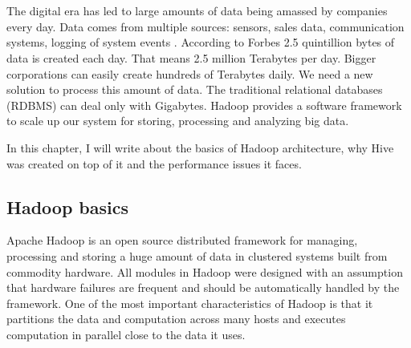 \chapter{\bevezetes}


The digital era has led to large amounts of data being amassed by companies every day. Data comes from multiple sources: sensors, sales data, communication systems, logging of system events \etc. According to Forbes \cite{Forbes} 2.5 quintillion bytes of data is created each day. That means 2.5 million Terabytes per day. Bigger corporations can easily create hundreds of Terabytes daily. We need a new solution to process this amount of data. The traditional relational databases (RDBMS) can deal only with Gigabytes. Hadoop provides a software framework to scale up our system for storing, processing and analyzing big data.

In this chapter, I will write about the basics of Hadoop architecture, why Hive was created on top of it and the performance issues it faces.

\section{Hadoop basics}
Apache Hadoop is an open source distributed framework for managing, processing  and storing a huge amount of data in clustered systems built from commodity hardware. All modules in Hadoop were designed with an assumption that hardware failures are frequent and should be automatically handled by the framework. One of the most important characteristics of Hadoop is that it partitions the data and computation across many hosts and executes computation in parallel close to the data it uses.  \cite{Hadoop-wiki}

